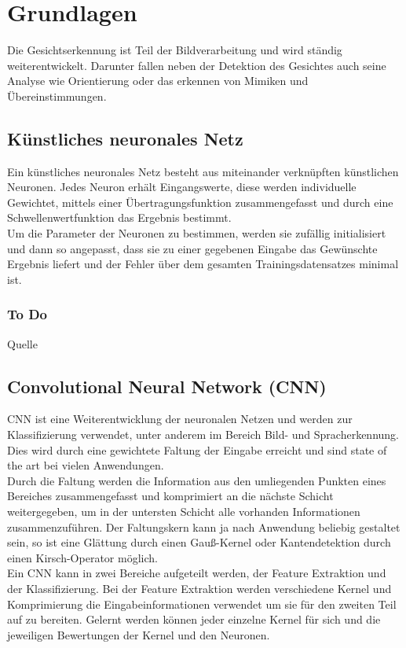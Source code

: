 \section{Grundlagen}
Die Gesichtserkennung ist Teil der Bildverarbeitung und wird ständig weiterentwickelt. Darunter fallen neben der Detektion des Gesichtes auch seine Analyse wie Orientierung oder das erkennen von Mimiken und Übereinstimmungen. 
\subsection{Künstliches neuronales Netz}
Ein künstliches neuronales Netz besteht aus miteinander verknüpften künstlichen Neuronen. Jedes Neuron erhält Eingangswerte, diese werden individuelle Gewichtet, mittels einer Übertragungsfunktion zusammengefasst und durch eine Schwellenwertfunktion das Ergebnis bestimmt.\\
Um die Parameter der Neuronen zu bestimmen, werden sie zufällig initialisiert und dann so angepasst, dass sie zu einer gegebenen Eingabe das Gewünschte Ergebnis liefert und der Fehler über dem gesamten Trainingsdatensatzes minimal ist.
\subsubsection{To Do}
Quelle
\subsection{Convolutional Neural Network (CNN)}
CNN ist eine Weiterentwicklung der neuronalen Netzen und werden zur Klassifizierung verwendet, unter anderem im Bereich Bild- und Spracherkennung. Dies wird durch eine gewichtete Faltung der Eingabe erreicht und sind state of the art bei vielen Anwendungen.\\
Durch die Faltung werden die Information aus den umliegenden Punkten eines Bereiches zusammengefasst und komprimiert an die nächste Schicht weitergegeben, um in der untersten Schicht alle vorhanden Informationen zusammenzuführen. 
Der Faltungskern kann ja nach Anwendung beliebig gestaltet sein, so ist eine Glättung durch einen Gauß-Kernel oder Kantendetektion durch einen Kirsch-Operator möglich.\\
Ein CNN kann in zwei Bereiche aufgeteilt werden, der Feature Extraktion und der Klassifizierung. Bei der Feature Extraktion werden verschiedene Kernel und Komprimierung die Eingabeinformationen verwendet um sie für den zweiten Teil auf zu bereiten.
Gelernt werden können jeder einzelne Kernel für sich und die jeweiligen Bewertungen der Kernel und den Neuronen.
